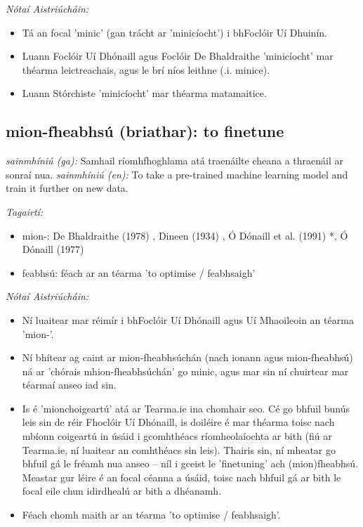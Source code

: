 \documentclass{article}
\begin{document}
 \noindent \textit{Nótaí Aistriúcháin:}
\begin{itemize}
	\item Tá an focal 'minic' (gan trácht ar 'minicíocht') i bhFoclóir Uí Dhuinín.
	\item Luann Foclóir Uí Dhónaill agus Foclóir De Bhaldraithe 'minicíocht' mar théarma leictreachais, agus le brí níos leithne (.i. minice).
	\item Luann Stórchiste 'minicíocht' mar théarma matamaitice.
\end{itemize}


\subsection*{mion-fheabhsú (briathar): to finetune} 
 \noindent \textit{sainmhíniú (ga):} Samhail ríomhfhoghlama atá traenáilte cheana a thraenáil ar sonraí nua.
\newline\newline
 \noindent \textit{sainmhíniú (en):} To take a pre-trained machine learning model and train it further on new data.
\newline

 \noindent \textit{Tagairtí:}
\begin{itemize}
	\item mion-: De Bhaldraithe (1978) \cite{de-bhaldraithe}, Dineen (1934) \cite{dineen}, Ó Dónaill et al. (1991) \cite{focloir-beag}*, Ó Dónaill (1977) \cite{odonaill}
	\item feabhsú: féach ar an téarma 'to optimise / feabhsaigh'
\end{itemize}

 \noindent \textit{Nótaí Aistriúcháin:}
\begin{itemize}
	\item Ní luaitear mar réimír i bhFoclóir Uí Dhónaill agus Uí Mhaoileoin an téarma 'mion-'.
	\item Ní bhítear ag caint ar mion-fheabhsúchán (nach ionann agus mion-fheabhsú) ná ar 'chórais mhion-fheabhsúchán' go minic, agus mar sin ní chuirtear mar téarmaí anseo iad sin.
	\item Is é 'mionchoigeartú' atá ar Tearma.ie ina chomhair seo. Cé go bhfuil bunús leis sin de réir Fhoclóir Uí Dhónaill, is doiléire é mar théarma toisc nach mbíonn coigeartú in úsáid i gcomhthéacs ríomheolaíochta ar bith (fiú ar Tearma.ie, ní luaitear an comhthéacs sin leis). Thairis sin, ní mheatar go bhfuil gá le fréamh nua anseo -- níl i gceist le 'finetuning' ach (mion)fheabhsú. Meastar gur léire é an focal céanna a úsáid, toisc nach bhfuil gá ar bith le focal eile chun idirdhealú ar bith a dhéanamh.
	\item Féach chomh maith ar an téarma 'to optimise / feabhsaigh'.
\end{itemize}
\end{document}
